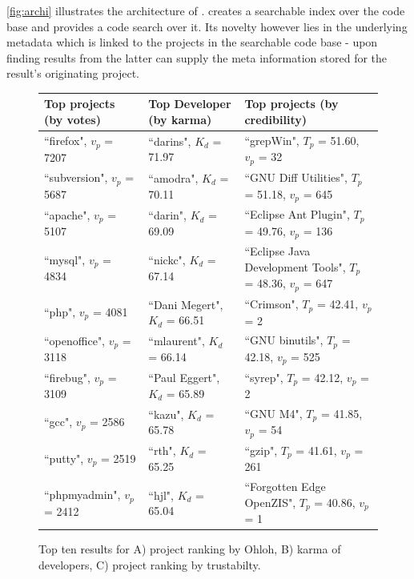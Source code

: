 \autoref{fig:archi} illustrates the architecture of \Jbd. \Jbd creates a searchable index over the code base and provides a code search over it. Its novelty however lies in the underlying metadata which is linked to the projects in the searchable code base - upon finding results from the latter \Jbd can supply the meta information stored for the result's originating project.


\begin{figure}
{\small
  \centering
\begin{tabular}{ l | l | l }%
\textbf{Top projects (by votes)} & \textbf{Top Developer (by karma)} & \textbf{Top projects (by credibility)}
\\\hline
``firefox", $v_p$ = 7207 & ``darins", $K_{d}$ = 71.97 & ``grepWin", $T_{p}$ = 51.60, $v_p$ = 32
\\%
``subversion", $v_p$ = 5687 & ``amodra", $K_{d}$ = 70.11 & ``GNU Diff Utilities", $T_{p}$ = 51.18, $v_p$ = 645
\\%
``apache", $v_p$ = 5107 & ``darin", $K_{d}$ = 69.09 & ``Eclipse Ant Plugin", $T_{p}$ = 49.76, $v_p$ = 136
\\%
``mysql", $v_p$ = 4834 & ``nickc", $K_{d}$ = 67.14 & ``Eclipse Java Development Tools", $T_{p}$ = 48.36, $v_p$ = 647
\\%
``php", $v_p$ = 4081 & ``Dani Megert", $K_{d}$ = 66.51 & ``Crimson", $T_{p}$ = 42.41, $v_p$ = 2
\\%
``openoffice", $v_p$ = 3118 & ``mlaurent", $K_{d}$ = 66.14 & ``GNU binutils", $T_{p}$ = 42.18, $v_p$ = 525
\\%
``firebug", $v_p$ = 3109 & ``Paul Eggert", $K_{d}$ = 65.89 & ``syrep", $T_{p}$ = 42.12, $v_p$ = 2
\\%
``gcc", $v_p$ = 2586 & ``kazu", $K_{d}$ = 65.78 & ``GNU M4", $T_{p}$ = 41.85, $v_p$ = 54
\\%
``putty", $v_p$ = 2519 & ``rth", $K_{d}$ = 65.25 & ``gzip", $T_{p}$ = 41.61, $v_p$ = 261
\\%
``phpmyadmin", $v_p$ = 2412 & ``hjl", $K_{d}$ = 65.04 & ``Forgotten Edge OpenZIS", $T_{p}$ = 40.86, $v_p$ = 1
\\%
\end{tabular}
\caption{
{\small
Top ten results for A) project ranking by Ohloh, B) karma of developers, C) project ranking by trustabilty.
}}
\label{fig:table}
}
\end{figure}

